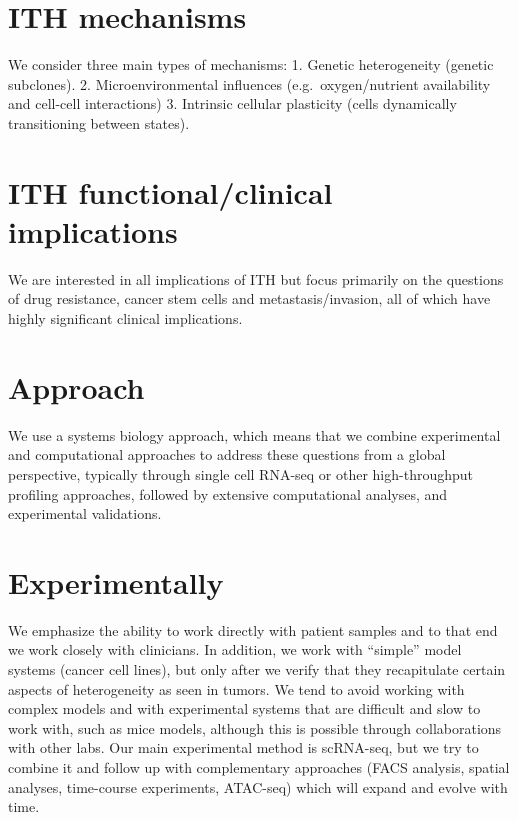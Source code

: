 \documentclass[
]{book}
\begin{document}
\hypertarget{ith-mechanisms}{%
\section{ITH mechanisms}\label{ith-mechanisms}}

We consider three main types of mechanisms:
1. Genetic heterogeneity (genetic subclones).
2. Microenvironmental influences (e.g.~oxygen/nutrient availability and cell-cell interactions)
3. Intrinsic cellular plasticity (cells dynamically transitioning between states).

\hypertarget{ith-functionalclinical-implications}{%
\section{ITH functional/clinical implications}\label{ith-functionalclinical-implications}}

We are interested in all implications of ITH but focus primarily on the questions of drug resistance, cancer stem cells and metastasis/invasion, all of which have highly significant clinical implications.

\hypertarget{approach}{%
\section{Approach}\label{approach}}

We use a systems biology approach, which means that we combine experimental and computational approaches to address these questions from a global perspective, typically through single cell RNA-seq or other high-throughput profiling approaches, followed by extensive computational analyses, and experimental validations.

\hypertarget{experimentally}{%
\section{Experimentally}\label{experimentally}}

We emphasize the ability to work directly with patient samples and to that end we work closely with clinicians. In addition, we work with ``simple'' model systems (cancer cell lines), but only after we verify that they recapitulate certain aspects of heterogeneity as seen in tumors. We tend to avoid working with complex models and with experimental systems that are difficult and slow to work with, such as mice models, although this is possible through collaborations with other labs. Our main experimental method is scRNA-seq, but we try to combine it and follow up with complementary approaches (FACS analysis, spatial analyses, time-course experiments, ATAC-seq) which will expand and evolve with time.
\end{document}
